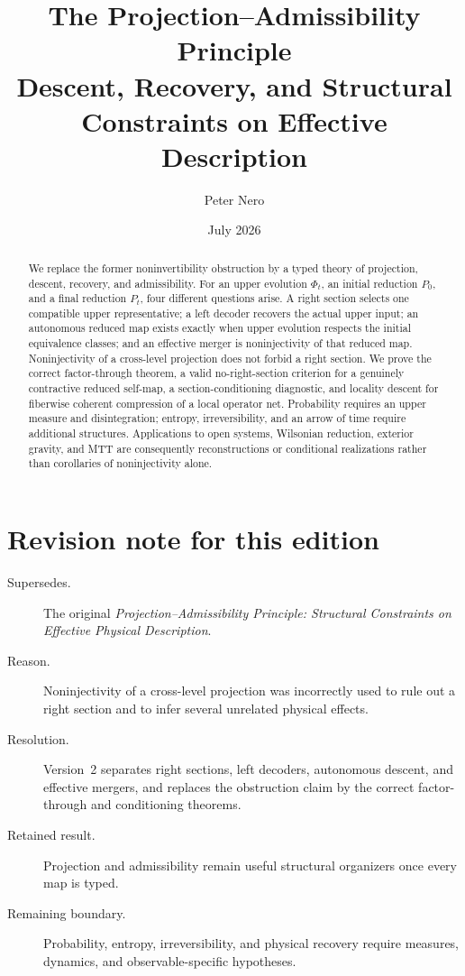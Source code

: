 \documentclass[11pt]{article}
\title{The Projection--Admissibility Principle\\
\large Descent, Recovery, and Structural Constraints on Effective Description}
\author{Peter Nero}
\date{July 2026}
\begin{document}
\maketitle
\seriestagline

\begin{abstract}
We replace the former noninvertibility obstruction by a typed theory of
projection, descent, recovery, and admissibility. For an upper evolution
$\Phi_t$, an initial reduction $P_0$, and a final reduction $P_t$, four
different questions arise. A right section selects one compatible upper
representative; a left decoder recovers the actual upper input; an autonomous
reduced map exists exactly when upper evolution respects the initial
equivalence classes; and an effective merger is noninjectivity of that reduced
map. Noninjectivity of a cross-level projection does not forbid a right
section. We prove the correct factor-through theorem, a valid no-right-section
criterion for a genuinely contractive reduced self-map, a section-conditioning
diagnostic, and locality descent for fiberwise coherent compression of a local
operator net. Probability requires an upper measure and disintegration;
entropy, irreversibility, and an arrow of time require additional structures.
Applications to open systems, Wilsonian reduction, exterior gravity, and MTT
are consequently reconstructions or conditional realizations rather than
corollaries of noninjectivity alone.
\end{abstract}

\section*{Revision note for this edition}
\begin{description}
\item[Supersedes.] The original \emph{Projection--Admissibility Principle:
Structural Constraints on Effective Physical Description}.
\item[Reason.] Noninjectivity of a cross-level projection was incorrectly used
to rule out a right section and to infer several unrelated physical effects.
\item[Resolution.] Version~2 separates right sections, left decoders,
autonomous descent, and effective mergers, and replaces the obstruction claim
by the correct factor-through and conditioning theorems.
\item[Retained result.] Projection and admissibility remain useful structural
organizers once every map is typed.
\item[Remaining boundary.] Probability, entropy, irreversibility, and physical
recovery require measures, dynamics, and observable-specific hypotheses.
\end{description}
\end{document}
